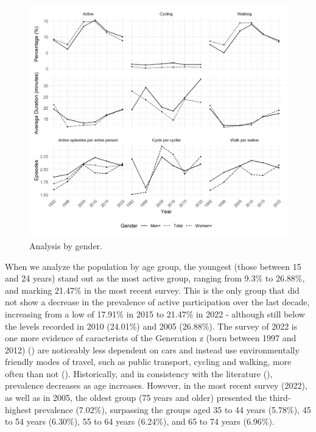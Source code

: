 \documentclass[preprint, 3p,
authoryear]{elsarticle} %
\begin{document}
\begin{figure}
\includegraphics[width=1\linewidth]{figures/combined_plot_gender} \caption{Analysis by gender.}\label{fig:gender-combined-figure}
\end{figure}

When we analyze the population by age group, the youngest (those between
15 and 24 years) stand out as the most active group, ranging from 9.3\%
to 26.88\%, and marking 21.47\% in the most recent survey. This is the
only group that did not show a decrease in the prevalence of active
participation over the last decade, increasing from a low of 17.91\% in
2015 to 21.47\% in 2022 - although still below the levels recorded in
2010 (24.01\%) and 2005 (26.88\%). The survey of 2022 is one more
evidence of caracterists of the Generation z (born between 1997 and
2012) (\citep{dimock2019}) are noticeably less dependent on cars and
instead use environmentally friendly modes of travel, such as public
transport, cycling and walking, more often than not
(\citep{haseeb2024, grimsrud2014, kuhnimhof2011}). Historically, and in
consistency with the literature
(\citep{bryan2009patterns, borhani2024}), prevalence decreases as age
increases. However, in the most recent survey (2022), as well as in
2005, the oldest group (75 years and older) presented the third-highest
prevalence (7.02\%), surpassing the groups aged 35 to 44 years (5.78\%),
45 to 54 years (6.30\%), 55 to 64 years (6.24\%), and 65 to 74 years
(6.96\%).
\end{document}
